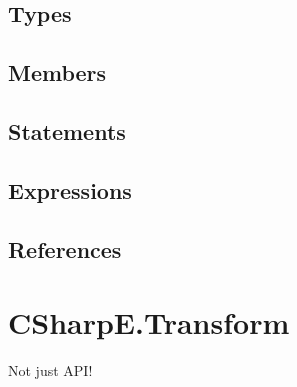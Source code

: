 \subsection{Types}

\subsection{Members}

\subsection{Statements}

\subsection{Expressions}

\subsection{References}

\section{CSharpE.Transform}

\label{no-parent}

Not just API!
